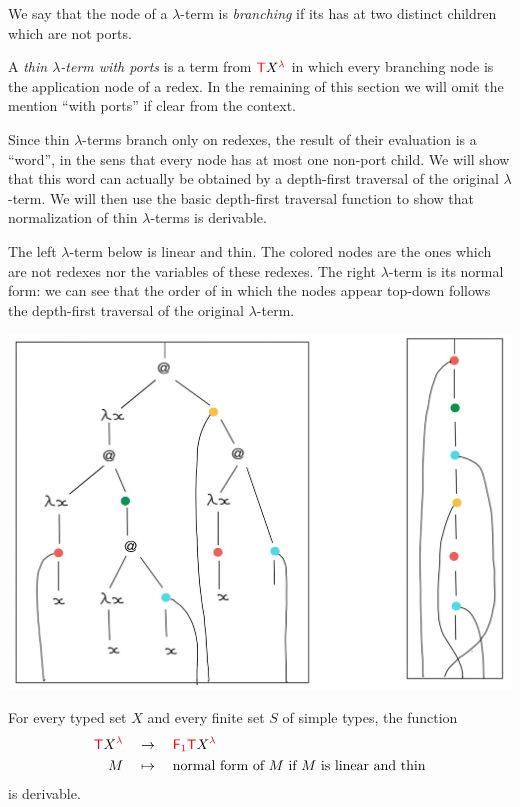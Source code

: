 \begin{definition}
We say that the node of a $\lambda$-term is \emph{branching} if its has at two distinct children which are not ports.
 
A \emph{thin $\lambda$-term with ports} is a term from ${\color{red}{\mathsf T}} {X}^{{\color{red}{\lambda}}}$ in which every branching node is the application node of a redex. In the remaining of this section we will omit the mention ``with ports'' if clear from the context.
\end{definition}

Since thin $\lambda$-terms branch only on redexes, the result of their evaluation is a ``word'', in the sens that every node has at most one non-port child.  We will show that this word can actually be obtained by a depth-first traversal of the original $\lambda$-term. We will then use the basic depth-first traversal  function to show that normalization of thin $\lambda$-terms is derivable. 

The left $\lambda$-term below is linear and thin. The colored nodes are the ones which are not redexes nor the variables of these redexes. The right $\lambda$-term is its normal form: we can see that the order of in which the nodes appear top-down follows the depth-first traversal of the original $\lambda$-term.  
\begin{center}
		\includegraphics[scale=.12]{MyPic10.jpg}
		\end{center}

\begin{proposition}\label{prop:EvaluateThin}
 For every typed set $X$ and every finite set $S$ of simple types, the function 
    \begin{align*}
    {\color{red}{\mathsf T}} {X}^{{\color{red}{\lambda}}} &\quad\to\quad {\color{red}{\mathsf F_{1}}}{\color{red}{\mathsf T}} {X}^{{\color{red}{\lambda}}}\\
        M & \quad \mapsto \quad \text{normal form of $M$ if $M$ is linear and thin}
    \end{align*}
    is derivable.
\end{proposition}

